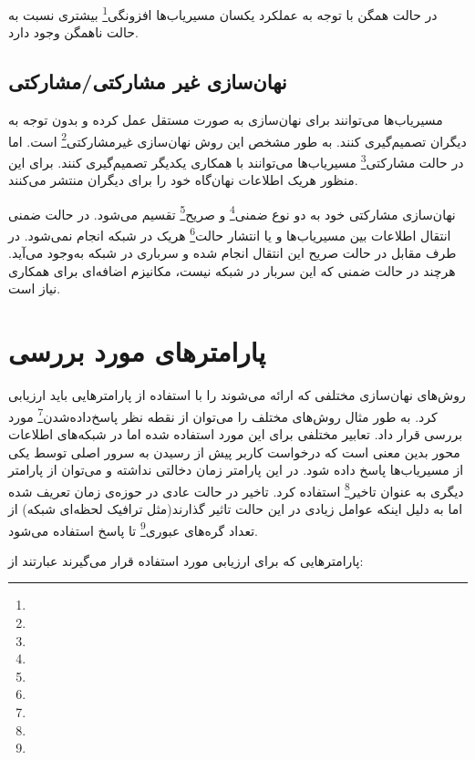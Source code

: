 در حالت همگن با توجه به عملکرد یکسان مسیریاب‌ها افزونگی\footnote{} بیشتری نسبت به حالت ناهمگن وجود دارد. 

\subsection{نهان‌سازی غیر مشارکتی/مشارکتی}

مسیریاب‌ها می‌توانند برای نهان‌سازی به صورت مستقل عمل کرده و بدون توجه به دیگران تصمیم‌گیری کنند. به طور مشخص این روش نهان‌سازی غیرمشارکتی\footnote{} است. اما در حالت مشارکتی\footnote{} مسیریاب‌ها می‌توانند با همکاری یکدیگر تصمیم‌گیری کنند. برای این منظور هریک اطلاعات نهان‌گاه خود را برای دیگران منتشر می‌کنند. 

نهان‌سازی مشارکتی خود به دو نوع ضمنی\footnote{} و صریح\footnote{} تقسیم می‌شود. در حالت ضمنی انتقال اطلاعات بین مسیریاب‌ها و یا انتشار حالت\footnote{} هریک در شبکه انجام نمی‌شود. در طرف مقابل در حالت صریح این انتقال انجام شده و سرباری در شبکه به‌وجود می‌آید. هرچند در حالت ضمنی که این سربار در شبکه نیست، مکانیزم اضافه‌ای برای همکاری نیاز است.


\section{پارامترهای مورد بررسی}
روش‌های نهان‌سازی مختلفی که ارائه می‌شوند را با استفاده از پارامترهایی باید ارزیابی کرد. به طور مثال روش‌های مختلف را می‌توان از نقطه نظر پاسخ‌داده‌شدن\footnote{} مورد بررسی قرار داد. تعابیر مختلفی برای این مورد استفاده شده اما در شبکه‌های اطلاعات محور بدین معنی است که درخواست کاربر پیش از رسیدن به سرور اصلی توسط یکی از مسیریاب‌ها پاسخ داده شود. در این پارامتر زمان دخالتی نداشته و می‌توان از پارامتر دیگری به عنوان تاخیر\footnote{} استفاده کرد. تاخیر در حالت عادی در حوزه‌ی زمان تعریف شده اما به دلیل اینکه عوامل زیادی در این حالت تاثیر گذارند(مثل ترافیک لحظه‌ای شبکه) از تعداد گره‌های عبوری\footnote{} تا پاسخ استفاده می‌شود.

پارامتر‌هایی که برای ارزیابی مورد استفاده قرار می‌گیرند عبارتند از:


